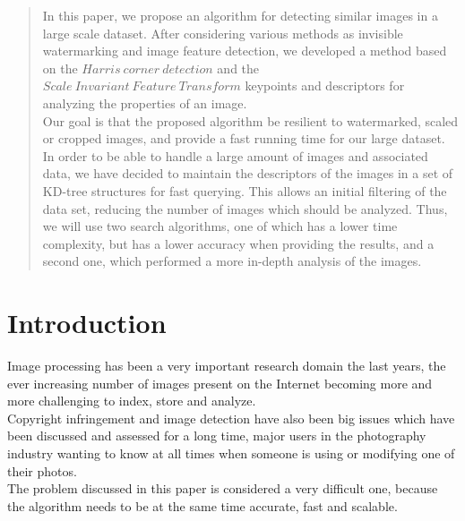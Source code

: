 \documentclass[conference]{IEEEtran}
\begin{document}
\begin{abstract}
In this paper, we propose an algorithm for detecting similar images in a large scale dataset. After considering various methods as invisible watermarking and image feature detection, we developed a method based on the $Harris\ corner\ detection$ and the $Scale\ Invariant\ Feature\ Transform$ keypoints and descriptors for analyzing the properties of an image.\\
Our goal is that the proposed algorithm be resilient to watermarked, scaled or cropped images, and provide a fast running time for our large dataset.\\
In order to be able to handle a large amount of images and associated data, we have decided to maintain the descriptors of the images in a set of KD-tree structures for fast querying. This allows an initial filtering of the data set, reducing the number of images which should be analyzed. Thus, we will use two search algorithms, one of which has a lower time complexity, but has a lower accuracy when providing the results, and a second one, which performed a more in-depth analysis of the images.\\
\end{abstract}





%
\IEEEpeerreviewmaketitle



\section{Introduction}
Image processing has been a very important research domain the last years, the ever increasing number of images present on the Internet becoming more and more challenging to index, store and analyze.\\
Copyright infringement and image detection have also been big issues which have been discussed and assessed for a long time, major users in the photography industry wanting to know at all times when someone is using or modifying one of their photos.\\
The problem discussed in this paper is considered a very difficult one, because the algorithm needs to be at the same time accurate, fast and scalable. \\
\end{document}

